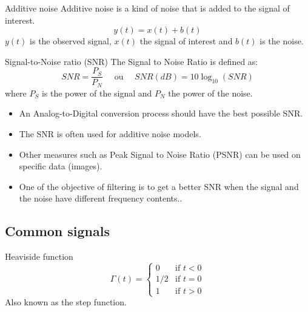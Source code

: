      \begin{block}{Additive noise}
      Additive noise is a kind of noise that is added to the signal of interest.
  $$y(t)=x(t)+b(t)$$
  $y(t)$ is the observed signal, $x(t)$ the signal of interest and
  $b(t)$ is the noise.
    \end{block}

    \begin{block}{Signal-to-Noise ratio (SNR)} 
      The Signal to Noise Ratio is defined as:
  \begin{equation}
    \label{eq:rsb}
    SNR=\frac{P_S}{P_N} \quad \text{ ou } \quad SNR(dB)=10\log_{10}(SNR)
  \end{equation}
  where $P_S$ is the power of the signal and $P_N$ the power of the noise.
  \begin{itemize}
  \item An Analog-to-Digital conversion process should have the best possible SNR.
  \item The SNR is often used for additive noise models.
  \item Other measures such as Peak Signal to Noise Ratio (PSNR) can be used on specific data (images).
  \item One of the objective of filtering is to get a better SNR when the signal and the noise have different frequency contents..
  \end{itemize}
    \end{block}





\subsection{Common signals}
\label{sec:common_sig}


\begin{block}{Heaviside function}
  \begin{equation}
\label{eq:heaviside}
\Gamma(t)=
\begin{cases}
  0& \text{if } t<0\\
  1/2& \text{if } t=0\\
  1 & \text{if } t>0
\end{cases}
\end{equation}
Also known as the step function. 
\end{block}

